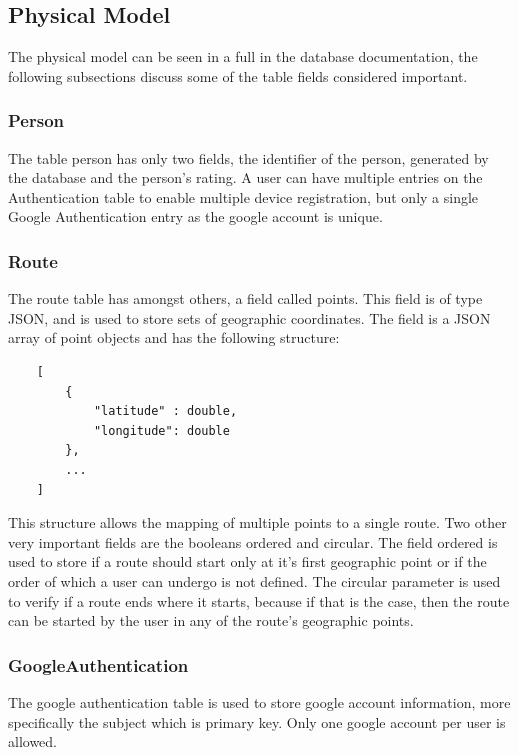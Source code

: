     \subsection{Physical Model}
    The physical model can be seen in a full in the database documentation\cite{servicedbms}, the following subsections discuss 
    some of the table fields considered important.

        \subsubsection*{Person}
        The table person has only two fields, the identifier of the person, generated by the database and the person's rating.
        A user can have multiple entries on the Authentication table to enable multiple device registration, 
        but only a single Google Authentication entry as the google account is unique.

        \subsubsection*{Route}
        The route table has amongst others, a field called points. This field is of type JSON, and is used to store sets of geographic
        coordinates. The field is a JSON array of point objects and has the following structure:
            \begin{lstlisting}
    [    
        {
            "latitude" : double,
            "longitude": double
        },
        ...
    ]
            \end{lstlisting}
        This structure allows the mapping of multiple points to a single route.
        Two other very important fields are the booleans ordered and circular. The field ordered is used to store if a route should start only at it's first geographic
        point or if the order of which a user can undergo is not defined. The circular parameter is used to verify if a route ends where it starts,
        because if that is the case, then the route can be started by the user in any of the route's geographic points.

        \subsubsection*{GoogleAuthentication}
        The google authentication table is used to store google account information, more specifically the subject which is primary
        key. Only one google account per user is allowed.

